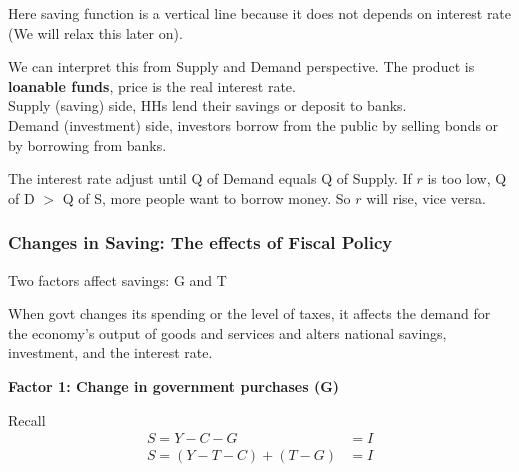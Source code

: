 \documentclass[12pt]{article}
\begin{document}
\begin{figure}[H]
\end{figure}

Here saving function is a vertical line because it does not depends on interest rate 
(We will relax this later on).

We can interpret this from Supply and Demand perspective. The product is {\textbf {
loanable funds}}, price is the real interest rate.\\
Supply (saving) side, HHs lend their savings or deposit to banks. \\
Demand (investment) side, investors borrow from the public by selling bonds or 
by borrowing from banks.

The interest rate adjust until Q of Demand equals Q of Supply. If $ r $ is too low,
Q of D $ > $ Q of S, more people want to borrow money. So $ r $ will rise, vice versa.



\subsubsection{Changes in Saving: The effects of Fiscal Policy}

Two factors affect savings: G and T


When govt changes its spending or the level of taxes, it affects the demand for the
economy's output of goods and services and alters national savings, investment, and
the interest rate.

{\textbf {Factor 1: Change in government purchases (G)}}

Recall
\begin{align*}
S = Y - C - G &= I\\
S = (Y - T - C) + (T - G) &= I
\end{align*}
\end{document}

